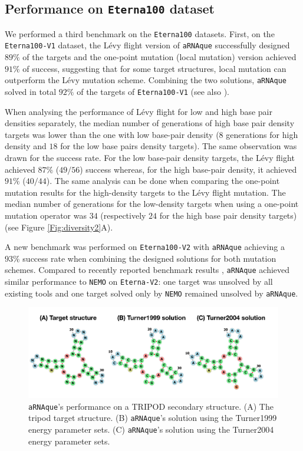 \subsection{Performance on \texttt{Eterna100} dataset}

We performed a third benchmark on the \texttt{Eterna100} datasets. First, on the \texttt{Eterna100-V1} dataset, the Lévy flight version of \texttt{aRNAque} successfully designed $89\%$ of the targets and the one-point mutation (local mutation) version achieved $91\%$ of success, suggesting that for some target structures, local mutation can outperform the Lévy mutation scheme. Combining the two solutions, \texttt{aRNAque} solved in total $92\%$ of the targets of \texttt{Eterna100-V1} (see also \cite{merleau2021simple}). 

When analysing the performance of Lévy flight for low and high base pair densities separately, the median number of generations of high base pair density targets was lower than the one with low base-pair density ($8$ generations for high density and $18$ for the low base pairs density targets). The same observation was drawn for the success rate. For the low base-pair density targets, the Lévy flight achieved $87\%$ ($49/56$) success whereas, for the high base-pair density, it achieved $91\%$ ($40/44$). The same analysis can be done when comparing the one-point mutation results for the high-density targets to the Lévy flight mutation. The median number of generations for the low-density targets when using a one-point mutation operator was $34$ (respectively $24$ for the high base pair density targets) (see Figure \ref{Fig:diversity2}A). 


A new benchmark was performed on \texttt{Eterna100-V2} with \texttt{aRNAque} achieving a $93\%$ success rate when combining the designed solutions for both mutation schemes. Compared to recently reported benchmark results \cite{Eterna}, \texttt{aRNAque} achieved similar performance to \texttt{NEMO} on \texttt{Eterna-V2}: one target was unsolved by all existing tools and one target solved only by \texttt{NEMO} remained unsolved by \texttt{aRNAque}. 
\begin{figure}[t!]
	\includegraphics[width=1.0\linewidth]{../res/images/arnaque/fig9.png}
	\caption{\texttt{aRNAque}'s performance on a TRIPOD secondary structure. (A) The tripod target structure. (B) \texttt{aRNAque}'s solution using the Turner1999 energy parameter sets. (C) \texttt{aRNAque}'s solution using the Turner2004 energy parameter sets.}
	\label{Fig:tripod}
\end{figure}
